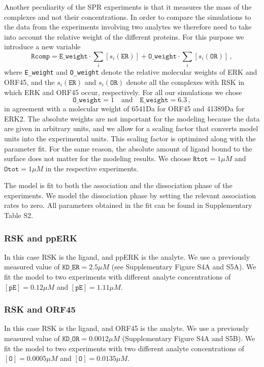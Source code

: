\documentclass[12pt]{article}
\begin{document}
	Another peculiarity of the SPR experiments is that it measures
	the mass of the complexes and not their concentrations. In order to compare the simulations to the data from the experiments involving two analytes we therefore need to take into account the relative weight of the different proteins. For this purpose we introduce a new variable 
	\begin{equation}
		\texttt{Rcomp}=\texttt{E\_weight}\cdot\sum_{i}[s_{i}(\texttt{ER})]+\texttt{O\_weight}\cdot\sum_{i}[s_{i}(\texttt{OR})]\,,
	\end{equation}
	where \texttt{E\_weight} and \texttt{O\_weight} denote the relative
	molecular weights of ERK and ORF45, and the $s_{i}(\texttt{ER})$
	and $s_{i}(\texttt{OR})$ denote all the complexes with RSK in which
	ERK and ORF45 occur, respectively. For all our simulations we chose
	\begin{equation}
		\texttt{O\_weight}=1\quad\text{and}\quad\texttt{E\_weight}=6.3\,,
	\end{equation}
	in agreement with a molecular weight of 6541Da for ORF45 and 41389Da
	for ERK2. The absolute weights are not important for the modeling
	because the data are given in arbitrary units, and we allow for a
	scaling factor that converts model units into the experimental units.
	This scaling factor is optimized along with the parameter fit. For
	the same reason, the absolute amount of ligand bound to the surface
	does not matter for the modeling results. We choose $\texttt{Rtot}=1\mu M$
	and $\texttt{Otot}=1\mu M$ in the respective experiments.
	
	The model is fit to both the association and the dissociation phase
	of the experiments. We model the dissociation phase by setting the
	relevant association rates to zero. All parameters obtained in the fit can be found in Supplementary Table S2.
	
	\subsubsection{RSK and ppERK}
	\label{sss:er} In this case RSK is the ligand, and ppERK is the analyte.
	We use a previously measured value of $\texttt{KD\_ER}=2.5\mu M$ (see Supplementary Figure S4A and S5A). We fit the model to two experiments with different analyte concentrations of $[\texttt{pE}]=0.12\mu M$ and
	$[\texttt{pE}]=1.11\mu M$.
	
	
	\subsubsection{RSK and ORF45}
	In this case RSK is the ligand, and ORF45 is the analyte. We use a
	previously measured value of $\texttt{KD\_OR}=0.0012\mu M$ (Supplementary Figure S4A and S5B). We fit the model to two experiments with two different analyte concentrations of $[\texttt{O}]=0.0005\mu M$ and $[\texttt{O}]=0.0135\mu M$.
	
\end{document}
